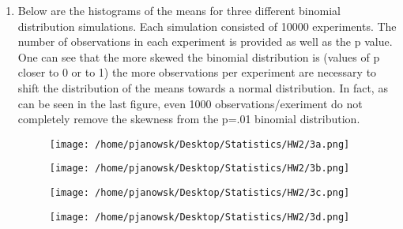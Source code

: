 \documentclass[11pt,letterpaper]{article}
\begin{document}
\begin{enumerate}
\item Below are the histograms of the means for three different binomial distribution simulations. Each simulation consisted of 10000 experiments. The number of observations in each experiment is provided as well as the p value. One can see that the more skewed the binomial distribution is (values of p closer to 0 or to 1) the more observations per experiment are necessary to shift the distribution of the means towards a normal distribution. In fact, as can be seen in the last figure, even 1000 observations/exeriment do not completely remove the skewness from the p=.01 binomial distribution.
        \begin{figure}[H]
            \centering
            \texttt{[image: /home/pjanowsk/Desktop/Statistics/HW2/3a.png]}
        \end{figure}
        \begin{figure}[H]
            \centering
            \texttt{[image: /home/pjanowsk/Desktop/Statistics/HW2/3b.png]}
        \end{figure}
        \begin{figure}[H]
            \centering
            \texttt{[image: /home/pjanowsk/Desktop/Statistics/HW2/3c.png]}
        \end{figure}
        \begin{figure}[H]
            \centering
            \texttt{[image: /home/pjanowsk/Desktop/Statistics/HW2/3d.png]}
        \end{figure}


\end{enumerate}
\end{document}
